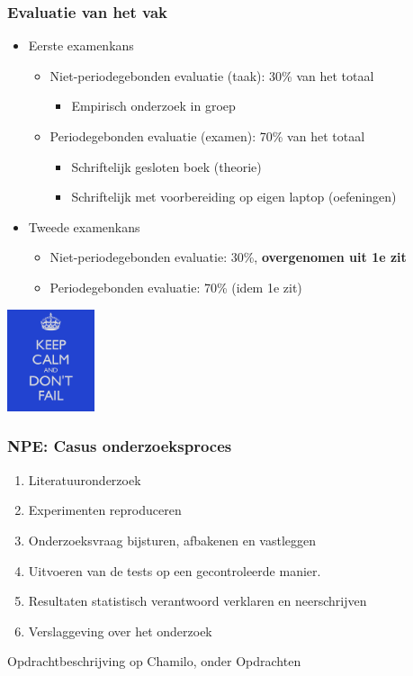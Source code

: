 \documentclass[aspectratio=169]{beamer}
\begin{document}
\begin{frame}
  \frametitle{Evaluatie van het vak}

  \begin{itemize}
    \item Eerste examenkans
      \begin{itemize}
        \item Niet-periodegebonden evaluatie (taak): 30\% van het totaal
          \begin{itemize}
            \item Empirisch onderzoek in groep
          \end{itemize}
        \item Periodegebonden evaluatie (examen): 70\% van het totaal
        \begin{itemize}
          \item Schriftelijk gesloten boek (theorie)
          \item Schriftelijk met voorbereiding op eigen laptop (oefeningen)
        \end{itemize}
      \end{itemize}
    \item Tweede examenkans
      \begin{itemize}
        \item Niet-periodegebonden evaluatie: 30\%, \textbf{overgenomen uit 1e zit}
        \item Periodegebonden evaluatie: 70\% (idem 1e zit)
      \end{itemize}
  \end{itemize}

  \begin{center}
    \includegraphics[height=3cm]{img/intro-07}
  \end{center}
\end{frame}

\begin{frame}
  \frametitle{NPE: Casus onderzoeksproces}


  \begin{enumerate}
    \item Literatuuronderzoek
    \item Experimenten reproduceren
    \item Onderzoeksvraag bijsturen, afbakenen en vastleggen
    \item Uitvoeren van de tests op een gecontroleerde manier.
    \item Resultaten statistisch verantwoord verklaren en neerschrijven
    \item Verslaggeving over het onderzoek
  \end{enumerate}

  Opdrachtbeschrijving op Chamilo, onder Opdrachten
\end{frame}

\end{document}
